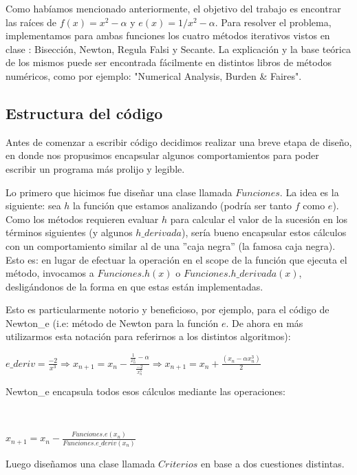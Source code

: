 Como habíamos mencionado anteriormente, el objetivo del trabajo es encontrar las raíces de $f(x)=x^{2} - \alpha$ y $e(x) = 1/x^{2} - \alpha$.
Para resolver el problema, implementamos para ambas funciones los cuatro métodos iterativos vistos en clase : Bisección, Newton, Regula Falsi y Secante.
La explicación y la base teórica de los mismos puede ser encontrada fácilmente en distintos libros de métodos numéricos, como
por ejemplo: "Numerical Analysis, Burden \& Faires". 

\subsection{Estructura del código}

Antes de comenzar a escribir código decidimos realizar una breve etapa de diseño, en donde nos propusimos encapsular algunos comportamientos para poder escribir un programa
más prolijo y legible.

Lo primero que hicimos fue diseñar una clase llamada $Funciones$. La idea es la siguiente: sea $h$ la función que estamos analizando (podría ser tanto $f$ como $e$).
Como los métodos requieren evaluar $h$ para calcular el valor de la sucesión en los términos siguientes (y algunos $h\_derivada$), sería bueno encapsular estos cálculos
con un comportamiento similar al de una ''caja negra'' (la famosa caja negra). Esto es: en lugar de efectuar la operación en el scope de la función que ejecuta el método,
invocamos a $Funciones.h(x)$ o $Funciones.h\_derivada(x)$, desligándonos de la forma en que estas están implementadas.

Esto es particularmente notorio y beneficioso, por ejemplo, para el código de Newton\_e (i.e: método de Newton para la función $e$. De ahora en más utilizarmos esta notación
para referirnos a los distintos algoritmos):

$\displaystyle e\_deriv = \frac{-2}{x^{3}} \Rightarrow x_{n+1} = x_{n} - \frac{\frac{1}{x_{n}^2}-\alpha}{\frac{-2}{x_{n}^{3}}} \Rightarrow 
x_{n+1} = x_{n} + \frac{(x_{n} - \alpha x_{n}^{3})}{2} $ 

Newton\_e encapsula todos esos cálculos mediante las operaciones:

~

$x_{n+1} = x_{n} - \frac{Funciones.e(x_{n})}{Funciones.e\_deriv(x_{n})}$

Luego dise\~namos una clase llamada $Criterios$ en base a dos cuestiones distintas. 

